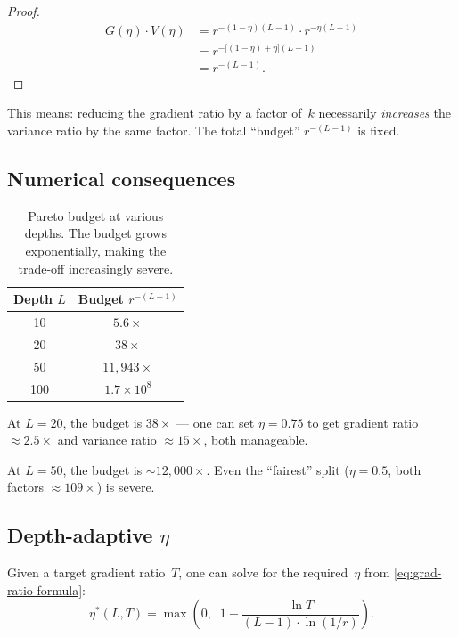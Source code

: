 \documentclass[11pt,a4paper]{article}
\theoremstyle{definition}
\begin{document}
\begin{proof}
  \begin{align*}
    G(\eta) \cdot V(\eta)
    &= r^{-(1-\eta)(L-1)} \cdot r^{-\eta(L-1)} \\
    &= r^{-\bigl[(1-\eta) + \eta\bigr](L-1)} \\
    &= r^{-(L-1)}.
  \end{align*}
\end{proof}

This means: reducing the gradient ratio by a factor of~$k$
necessarily \emph{increases} the variance ratio by the same
factor.  The total ``budget'' $r^{-(L-1)}$ is fixed.

\subsection{Numerical consequences}

\begin{table}[H]
\centering
\caption{Pareto budget at various depths.  The budget grows
         exponentially, making the trade-off increasingly severe.}
\label{tab:budget}
\begin{tabular}{c c}
\toprule
Depth $L$ & Budget $r^{-(L-1)}$ \\
\midrule
10  & $5.6\times$ \\
20  & $38\times$ \\
50  & $11{,}943\times$ \\
100 & $1.7 \times 10^8$ \\
\bottomrule
\end{tabular}
\end{table}

At $L = 20$, the budget is $38\times$ --- one can set $\eta = 0.75$
to get gradient ratio $\approx 2.5\times$ and variance ratio
$\approx 15\times$, both manageable.

At $L = 50$, the budget is $\sim\!12{,}000\times$.  Even the
``fairest'' split ($\eta = 0.5$, both factors $\approx 109\times$)
is severe.

\subsection{Depth-adaptive $\eta$}

Given a target gradient ratio~$T$, one can solve for the
required~$\eta$ from \eqref{eq:grad-ratio-formula}:
\begin{equation}\label{eq:eta-adaptive}
  \eta^{\ast}(L, T)
  = \max\!\left(0,\;\; 1 - \frac{\ln T}{(L-1) \cdot \ln(1/r)}\right).
\end{equation}
\end{document}
